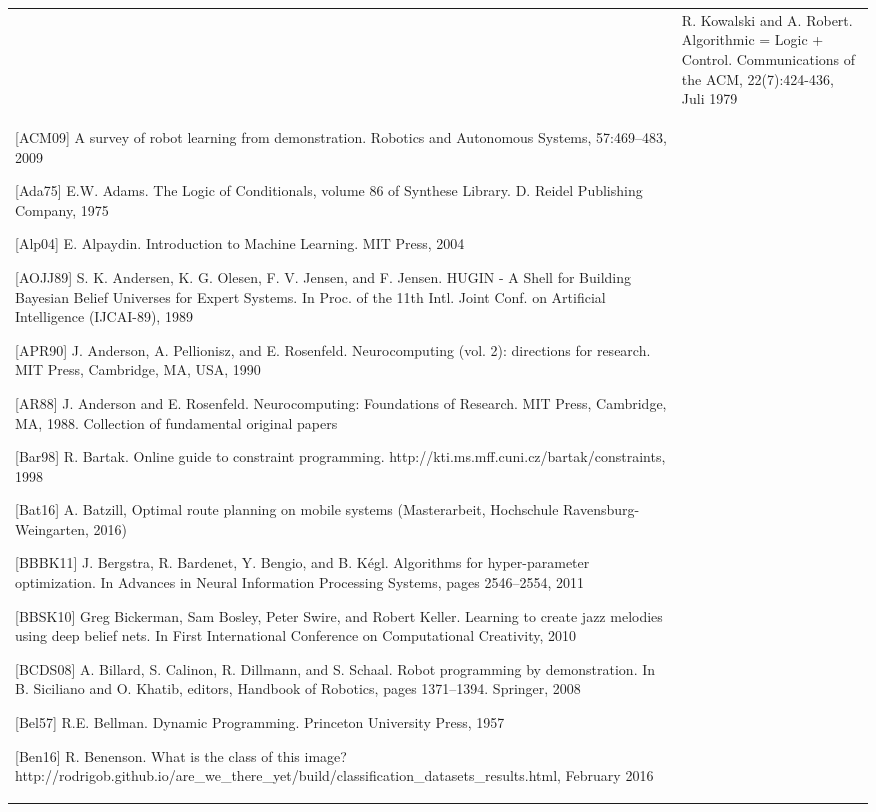 \documentclass[10pt]{book}
\begin{document}
\begin{tabular}{|l|l|}
\hline [\cite{kowalski1979algorithmic}] & R. Kowalski and A. Robert. Algorithmic = Logic + Control. Communications of the ACM, 22(7):424-436, Juli 1979 \\
[ACM09] A survey of robot learning from demonstration. Robotics and Autonomous Systems, 57:469–483, 2009

[Ada75] E.W. Adams. The Logic of Conditionals, volume 86 of Synthese Library. D. Reidel Publishing Company, 1975

[Alp04] E. Alpaydin. Introduction to Machine Learning. MIT Press, 2004

[AOJJ89] S. K. Andersen, K. G. Olesen, F. V. Jensen, and F. Jensen. HUGIN - A Shell for Building Bayesian Belief Universes for Expert Systems. In Proc. of the 11th Intl. Joint Conf. on Artificial Intelligence (IJCAI-89), 1989

[APR90] J. Anderson, A. Pellionisz, and E. Rosenfeld. Neurocomputing (vol. 2): directions for research. MIT Press, Cambridge, MA, USA, 1990

[AR88] J. Anderson and E. Rosenfeld. Neurocomputing: Foundations of Research. MIT Press, Cambridge, MA, 1988. Collection of fundamental original papers

[Bar98] R. Bartak. Online guide to constraint programming. http://kti.ms.mff.cuni.cz/bartak/constraints, 1998

[Bat16] A. Batzill, Optimal route planning on mobile systems (Masterarbeit, Hochschule Ravensburg-Weingarten, 2016)

[BBBK11] J. Bergstra, R. Bardenet, Y. Bengio, and B. Kégl. Algorithms for hyper-parameter optimization. In Advances in Neural Information Processing Systems, pages 2546–2554, 2011

[BBSK10] Greg Bickerman, Sam Bosley, Peter Swire, and Robert Keller. Learning to create jazz melodies using deep belief nets. In First International Conference on Computational Creativity, 2010

[BCDS08] A. Billard, S. Calinon, R. Dillmann, and S. Schaal. Robot programming by demonstration. In B. Siciliano and O. Khatib, editors, Handbook of Robotics, pages 1371–1394. Springer, 2008

[Bel57] R.E. Bellman. Dynamic Programming. Princeton University Press, 1957

[Ben16] R. Benenson. What is the class of this image? http://rodrigob.github.io/are\_we\_there\_yet/build/classification\_datasets\_results.html, February 2016


\end{tabular}
\end{document}
